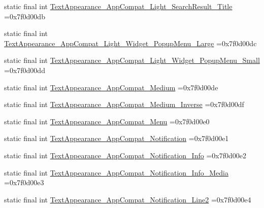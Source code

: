 \begin{DoxyCompactItemize}
\item 
static final int \mbox{\hyperlink{classbr_1_1unb_1_1cic_1_1mp_1_1marketmaster_1_1R_1_1style_aad941d9e8913885e834db8164255ac42}{Text\+Appearance\+\_\+\+App\+Compat\+\_\+\+Light\+\_\+\+Search\+Result\+\_\+\+Title}} =0x7f0d00db
\item 
static final int \mbox{\hyperlink{classbr_1_1unb_1_1cic_1_1mp_1_1marketmaster_1_1R_1_1style_adf541d46726a0d04888e739cd0b05c01}{Text\+Appearance\+\_\+\+App\+Compat\+\_\+\+Light\+\_\+\+Widget\+\_\+\+Popup\+Menu\+\_\+\+Large}} =0x7f0d00dc
\item 
static final int \mbox{\hyperlink{classbr_1_1unb_1_1cic_1_1mp_1_1marketmaster_1_1R_1_1style_a2483f9bfb387923bd573daecc536b480}{Text\+Appearance\+\_\+\+App\+Compat\+\_\+\+Light\+\_\+\+Widget\+\_\+\+Popup\+Menu\+\_\+\+Small}} =0x7f0d00dd
\item 
static final int \mbox{\hyperlink{classbr_1_1unb_1_1cic_1_1mp_1_1marketmaster_1_1R_1_1style_aafb649b2695ca0907089d774d39a1d52}{Text\+Appearance\+\_\+\+App\+Compat\+\_\+\+Medium}} =0x7f0d00de
\item 
static final int \mbox{\hyperlink{classbr_1_1unb_1_1cic_1_1mp_1_1marketmaster_1_1R_1_1style_aa30c850bd6771a1614c4e44f85aac428}{Text\+Appearance\+\_\+\+App\+Compat\+\_\+\+Medium\+\_\+\+Inverse}} =0x7f0d00df
\item 
static final int \mbox{\hyperlink{classbr_1_1unb_1_1cic_1_1mp_1_1marketmaster_1_1R_1_1style_aacf8d0b796e91475b83de04bac2e6872}{Text\+Appearance\+\_\+\+App\+Compat\+\_\+\+Menu}} =0x7f0d00e0
\item 
static final int \mbox{\hyperlink{classbr_1_1unb_1_1cic_1_1mp_1_1marketmaster_1_1R_1_1style_a7c938de62fc55bb424233285a4371a30}{Text\+Appearance\+\_\+\+App\+Compat\+\_\+\+Notification}} =0x7f0d00e1
\item 
static final int \mbox{\hyperlink{classbr_1_1unb_1_1cic_1_1mp_1_1marketmaster_1_1R_1_1style_afd007b1c356d143478c9ea955ba62e3d}{Text\+Appearance\+\_\+\+App\+Compat\+\_\+\+Notification\+\_\+\+Info}} =0x7f0d00e2
\item 
static final int \mbox{\hyperlink{classbr_1_1unb_1_1cic_1_1mp_1_1marketmaster_1_1R_1_1style_af4b40602f772abc0c45ece05fcd1c7df}{Text\+Appearance\+\_\+\+App\+Compat\+\_\+\+Notification\+\_\+\+Info\+\_\+\+Media}} =0x7f0d00e3
\item 
static final int \mbox{\hyperlink{classbr_1_1unb_1_1cic_1_1mp_1_1marketmaster_1_1R_1_1style_ac09def822846d81cb970230f13bc94c8}{Text\+Appearance\+\_\+\+App\+Compat\+\_\+\+Notification\+\_\+\+Line2}} =0x7f0d00e4
\item 

\end{DoxyCompactItemize}
